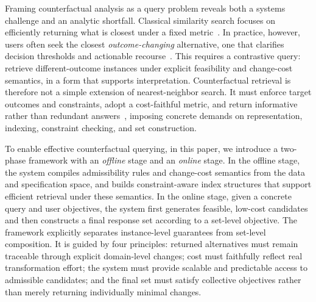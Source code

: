 Framing counterfactual analysis as a query problem reveals both a systems challenge and an analytic shortfall. Classical similarity search focuses on efficiently returning what is closest under a fixed metric~\cite{chaves2001searching, indyk1998approximate, malkov2020efficient}. In practice, however, users often seek the closest \emph{outcome-changing} alternative, one that clarifies decision thresholds and actionable recourse~\cite{lipton1990contrastive, miller2019explanation, shang2022whyami, bucinca2025contrastive}. This requires a contrastive query: retrieve different-outcome instances under explicit feasibility and change-cost semantics, in a form that supports interpretation. Counterfactual retrieval is therefore not a simple extension of nearest-neighbor search. It must enforce target outcomes and constraints, adopt a cost-faithful metric, and return informative rather than redundant answers~\cite{cherumanal2025diversification}, imposing concrete demands on representation, indexing, constraint checking, and set construction.

To enable effective counterfactual querying, in this paper, we introduce a two-phase framework with an \textit{offline} stage and an \textit{online} stage. In the offline stage, the system compiles admissibility rules and change-cost semantics from the data and specification space, and builds constraint-aware index structures that support efficient retrieval under these semantics. In the online stage, given a concrete query and user objectives, the system first generates feasible, low-cost candidates and then constructs a final response set according to a set-level objective. The framework explicitly separates instance-level guarantees from set-level composition. It is guided by four principles: returned alternatives must remain traceable through explicit domain-level changes; cost must faithfully reflect real transformation effort; the system must provide scalable and predictable access to admissible candidates; and the final set must satisfy collective objectives rather than merely returning individually minimal changes.


